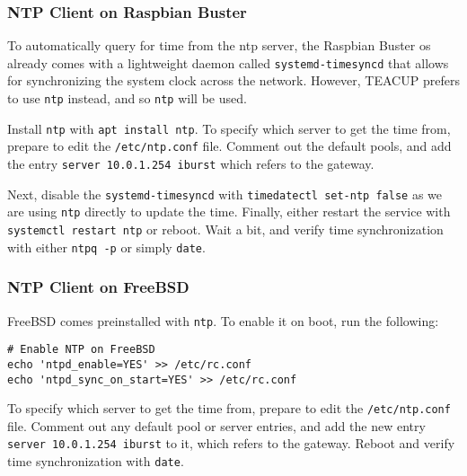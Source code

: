 \subsubsection{NTP Client on Raspbian Buster}

To automatically query for time from the \gls{ntp} server, the Raspbian Buster \gls{os} already comes with a lightweight daemon called \lstinline{systemd-timesyncd} that allows for synchronizing the system clock across the network. However, TEACUP prefers to use \lstinline{ntp} instead, and so \lstinline{ntp} will be used.

Install \lstinline{ntp} with \lstinline{apt install ntp}. To specify which server to get the time from, prepare to edit the \lstinline{/etc/ntp.conf} file. Comment out the default pools, and add the entry \lstinline{server 10.0.1.254 iburst} which refers to the gateway.

Next, disable the \lstinline{systemd-timesyncd} with \lstinline{timedatectl set-ntp false} as we are using \lstinline{ntp} directly to update the time. Finally, either restart the service with \lstinline{systemctl restart ntp} or reboot. Wait a bit, and verify time synchronization with either \lstinline{ntpq -p} or simply \lstinline{date}.

\subsubsection{NTP Client on FreeBSD}

FreeBSD comes preinstalled with \lstinline{ntp}. To enable it on boot, run the following:

\begin{verbatim}
# Enable NTP on FreeBSD
echo 'ntpd_enable=YES' >> /etc/rc.conf
echo 'ntpd_sync_on_start=YES' >> /etc/rc.conf
\end{verbatim}

To specify which server to get the time from, prepare to edit the \lstinline{/etc/ntp.conf} file. Comment out any default pool or server entries, and add the new entry \lstinline{server 10.0.1.254 iburst} to it, which refers to the gateway. Reboot and verify time synchronization with \lstinline{date}.























